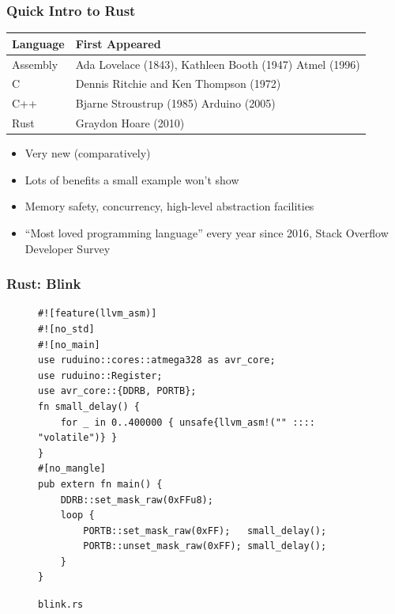 \documentclass{beamer} \usetheme{Madrid}
\begin{document}
\begin{frame}
    \frametitle{Quick Intro to Rust}
    \vfill
    \begin{center}
        \begin{tabular}{l|l}
            \textbf{Language} & \textbf{First Appeared}\\
            \hline
            Assembly & Ada Lovelace (1843), Kathleen Booth (1947) Atmel (1996) \\
            C & Dennis Ritchie and Ken Thompson (1972) \\
            C++ & Bjarne Stroustrup (1985) Arduino (2005) \\
            Rust & Graydon Hoare (2010)
       \end{tabular}
    \end{center}
    \vfill
    \begin{itemize}
        \item Very new (comparatively)
        \item Lots of benefits a small example won't show
        \item Memory safety, concurrency, high-level abstraction facilities
        \item ``Most loved programming language'' every year since 2016, Stack Overflow Developer Survey
    \end{itemize}
    \vfill
\end{frame}

\begin{frame}[fragile]
    \frametitle{Rust: Blink}
    \begin{figure}
    \begin{verbatim}
#![feature(llvm_asm)]
#![no_std]
#![no_main]
use ruduino::cores::atmega328 as avr_core;
use ruduino::Register;
use avr_core::{DDRB, PORTB};
fn small_delay() {
    for _ in 0..400000 { unsafe{llvm_asm!("" :::: "volatile")} }
}
#[no_mangle]
pub extern fn main() {
    DDRB::set_mask_raw(0xFFu8);
    loop {
        PORTB::set_mask_raw(0xFF);   small_delay();
        PORTB::unset_mask_raw(0xFF); small_delay();
    }
}
    \end{verbatim}
    \caption{\texttt{blink.rs}}
    \end{figure}
\end{frame}
\end{document}
